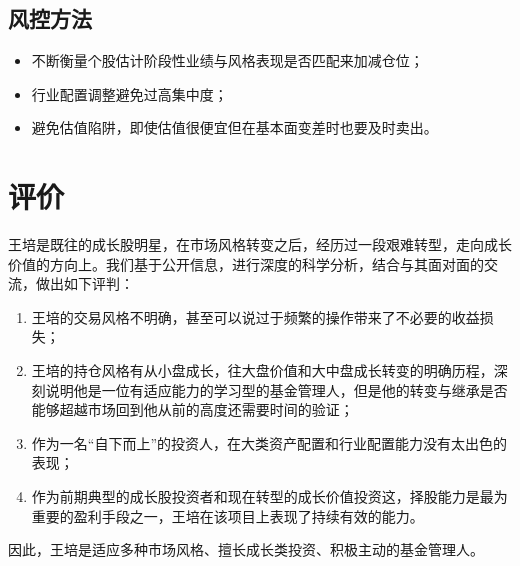\documentclass[hyperref,]{ctexart}
\providecommand{\tightlist}{%
  \setlength{\itemsep}{0pt}\setlength{\parskip}{0pt}}
\begin{document}
\subsection{风控方法}

\begin{itemize}
\tightlist
\item
  不断衡量个股估计阶段性业绩与风格表现是否匹配来加减仓位；
\item
  行业配置调整避免过高集中度；
\item
  避免估值陷阱，即使估值很便宜但在基本面变差时也要及时卖出。
\end{itemize}

\section{评价}

王培是既往的成长股明星，在市场风格转变之后，经历过一段艰难转型，走向成长价值的方向上。我们基于公开信息，进行深度的科学分析，结合与其面对面的交流，做出如下评判：

\begin{enumerate}
\def\labelenumi{\arabic{enumi}.}
\tightlist
\item
  王培的交易风格不明确，甚至可以说过于频繁的操作带来了不必要的收益损失；
\item
  王培的持仓风格有从小盘成长，往大盘价值和大中盘成长转变的明确历程，深刻说明他是一位有适应能力的学习型的基金管理人，但是他的转变与继承是否能够超越市场回到他从前的高度还需要时间的验证；
\item
  作为一名``自下而上''的投资人，在大类资产配置和行业配置能力没有太出色的表现；
\item
  作为前期典型的成长股投资者和现在转型的成长价值投资这，择股能力是最为重要的盈利手段之一，王培在该项目上表现了持续有效的能力。
\end{enumerate}

因此，王培是适应多种市场风格、擅长成长类投资、积极主动的基金管理人。
\end{document}
